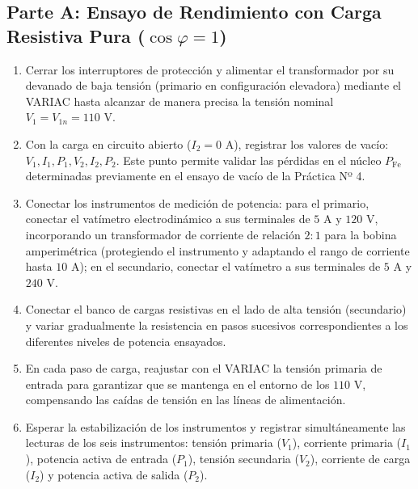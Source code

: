 \subsection{Parte A: Ensayo de Rendimiento con Carga Resistiva Pura (\texorpdfstring{$\cos\varphi = 1$}{cos phi = 1})}
\begin{enumerate}
    \item Cerrar los interruptores de protección y alimentar el transformador por su devanado de baja tensión (primario en configuración elevadora) mediante el VARIAC hasta alcanzar de manera precisa la tensión nominal $V_1 = V_{1n} = 110\text{ V}$.
    \item Con la carga en circuito abierto ($I_2 = 0\text{ A}$), registrar los valores de vacío: $V_1, I_1, P_1, V_2, I_2, P_2$. Este punto permite validar las pérdidas en el núcleo $P_{\text{Fe}}$ determinadas previamente en el ensayo de vacío de la Práctica Nº 4.
    \item Conectar los instrumentos de medición de potencia: para el primario, conectar el vatímetro electrodinámico a sus terminales de $5\text{ A}$ y $120\text{ V}$, incorporando un transformador de corriente de relación $2:1$ para la bobina amperimétrica (protegiendo el instrumento y adaptando el rango de corriente hasta $10\text{ A}$); en el secundario, conectar el vatímetro a sus terminales de $5\text{ A}$ y $240\text{ V}$.
    \item Conectar el banco de cargas resistivas en el lado de alta tensión (secundario) y variar gradualmente la resistencia en pasos sucesivos correspondientes a los diferentes niveles de potencia ensayados.
    \item En cada paso de carga, reajustar con el VARIAC la tensión primaria de entrada para garantizar que se mantenga en el entorno de los $110\text{ V}$, compensando las caídas de tensión en las líneas de alimentación.
    \item Esperar la estabilización de los instrumentos y registrar simultáneamente las lecturas de los seis instrumentos: tensión primaria ($V_1$), corriente primaria ($I_1$), potencia activa de entrada ($P_1$), tensión secundaria ($V_2$), corriente de carga ($I_2$) y potencia activa de salida ($P_2$).
\end{enumerate}

